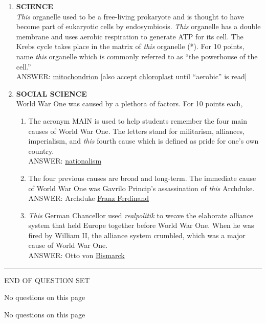 \documentclass{report}
\newcommand*{\backtrack}{\setcounter{enumi}{\numexpr\theenumi-1\relax}}
\begin{document}
\begin{enumerate}
    \item \textbf{SCIENCE} \\ \textit{This} organelle used to be a free-living prokaryote and is thought to have become part of eukaryotic cells by endosymbiosis. \textit{This} organelle has a double membrane and uses aerobic respiration to generate ATP for its cell. The Krebs cycle takes place in the matrix of \textit{this} organelle (*). For 10 points, name \textit{this} organelle which is commonly referred to as ``the powerhouse of the cell.'' \\ ANSWER: \underline{mitochondrion} [also accept \underline{chloroplast} until ``aerobic'' is read] \backtrack
    \item \textbf{SOCIAL SCIENCE} \\ World War One was caused by a plethora of factors. For 10 points each,
    \begin{enumerate}[label=\Alph*]
        \item The acronym MAIN is used to help students remember the four main causes of World War One. The letters stand for militarism, alliances, imperialism, and \textit{this} fourth cause which is defined as pride for one's own country. \\ ANSWER: \underline{nationalism}
        \item The four previous causes are broad and long-term. The immediate cause of World War One was Gavrilo Princip's assassination of \textit{this} Archduke. \\ ANSWER: Archduke \underline{Franz Ferdinand}
        \item \textit{This} German Chancellor used \textit{realpolitik} to weave the elaborate alliance system that held Europe together before World War One. When he was fired by William II, the alliance system crumbled, which was a major cause of World War One. \\ ANSWER: Otto von \underline{Bismarck}
    \end{enumerate}
\end{enumerate}

\vspace*{0.5 cm}
\centering
\rule{10 cm}{0.4pt}

\Large
END OF QUESTION SET
\newpage

\vspace*{\fill}
\centering
\thispagestyle{empty}
\Large
No questions on this page
\vspace*{\fill}

\newpage

\vspace*{\fill}
\centering
\thispagestyle{empty}
\Large
No questions on this page
\vspace*{\fill}
\end{document}
